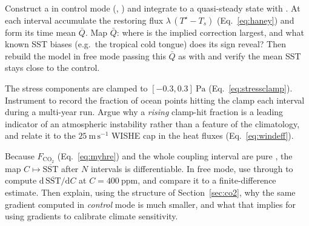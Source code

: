 \begin{exercise}
Construct a  in control mode (,
) and integrate to a quasi-steady state with
. At each interval accumulate the restoring flux
$\lambda\,(T^{\star}-T_s)$ (Eq.~\eqref{eq:haney}) and form its time mean
$\bar{Q}$. Map $\bar{Q}$: where is the implied correction largest, and what known
SST biases (e.g.\ the tropical cold tongue) does its sign reveal? Then rebuild the
model in free mode passing this $\bar{Q}$ as  with
 and verify the mean SST stays close to the control.
\end{exercise}

\begin{exercise}
The stress components are clamped to $[-0.3,0.3]\ \mathrm{Pa}$
(Eq.~\eqref{eq:stressclamp}). Instrument  to record the
fraction of ocean points hitting the clamp each interval during a multi-year run.
Argue why a \emph{rising} clamp-hit fraction is a leading indicator of an
atmospheric instability rather than a feature of the climatology, and relate it to
the $25\ \mathrm{m\,s^{-1}}$ WISHE cap in the heat fluxes (Eq.~\eqref{eq:windeff}).
\end{exercise}

\begin{exercise}
Because $F_{\mathrm{CO_2}}$ (Eq.~\eqref{eq:myhre}) and the whole coupling interval
are pure \jax{}, the map $C\mapsto \overline{\mathrm{SST}}$ after $N$ intervals is
differentiable. In free mode, use  through  to compute
$\mathrm{d}\,\overline{\mathrm{SST}}/\mathrm{d}C$ at $C=400\ \mathrm{ppm}$, and
compare it to a finite-difference estimate. Then explain, using the structure of
Section~\ref{sec:co2}, why the same gradient computed in \emph{control} mode is
much smaller, and what that implies for using gradients to calibrate climate
sensitivity.
\end{exercise}
